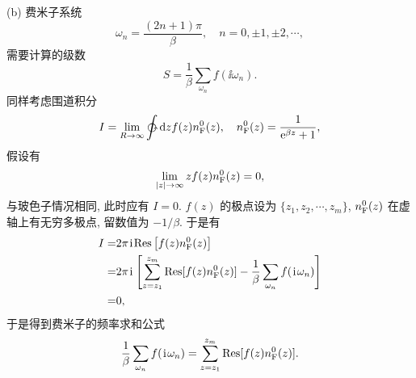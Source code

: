(b) 费米子系统 
\begin{equation}
    \omega_n=\frac{(2n+1)\pi}{\beta},\quad n=0,\pm1,\pm2,\cdots,
\end{equation}
需要计算的级数 
\begin{equation}
    S=\frac{1}{\beta}\sum_{\omega_n}f(\ii\omega_n).
\end{equation}
同样考虑围道积分
\begin{equation}
    I=\lim_{R\to \infty}\ointctrclockwise\dd zf(z)n_{\fun{F}}^{0}(z),\quad n_{\fun{F}}^{0}(z)=\frac{1}{\e^{\beta z}+1},
\end{equation}
假设有 
\begin{equation}
    \lim_{|z|\to \infty}z f(z)n_{\mathrm{F}}^{0}(z)=0,
\end{equation}
与玻色子情况相同, 此时应有 $I=0$. $f(z)$ 的极点设为 $\{ z_1,z_2,\cdots,z_m \}$, $n_{\mathrm{F}}^{0}(z)$ 在虚轴上有无穷多极点, 留数值为 $-1/\beta$. 于是有 
 \begin{align}
        I=&2\pi \hspace{0.1em}\mathrm{i}\hspace{0.1em}\mathrm{Res}\left[ f(z)n_{\mathrm{F}}^{0}(z) \right]\nonumber\\
        =&2\pi\hspace{0.1em}\mathrm{i}\hspace{0.1em} \left[ \sum_{z=z_1}^{z_m} \mathrm{Res}[f(z)n_{\mathrm{F}}^{0}(z)]-\frac{1}{\beta}\sum_{\omega_n}f(\hspace{0.1em}\mathrm{i}\hspace{0.1em}\omega_n) \right]\nonumber\\
        =&0,
    \end{align}
于是得到费米子的频率求和公式 
\begin{equation}
    \frac{1}{\beta}\sum_{\omega_n}f(\hspace{0.1em}\mathrm{i}\hspace{0.1em}\omega_n)=\sum_{z=z_1}^{z_m}\mathrm{Res}[f(z)n_{\mathrm{F}}^{0}(z)].
\end{equation}
